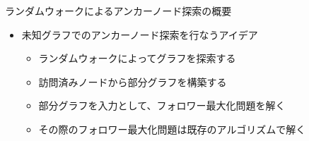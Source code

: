 \documentclass[compress,dvipdfmx,11pt]{beamer}
\begin{document}
\begin{frame}[label={sec:org27a6bc8}]{ランダムウォークによるアンカーノード探索の概要}
\begin{itemize}
\item 未知グラフでのアンカーノード探索を行なうアイデア
\begin{itemize}
\item ランダムウォークによってグラフを探索する
\item 訪問済みノードから部分グラフを構築する
\item 部分グラフを入力として、フォロワー最大化問題を解く
\item その際のフォロワー最大化問題は既存のアルゴリズムで解く
\end{itemize}
\end{itemize}
\end{frame}
\end{document}

